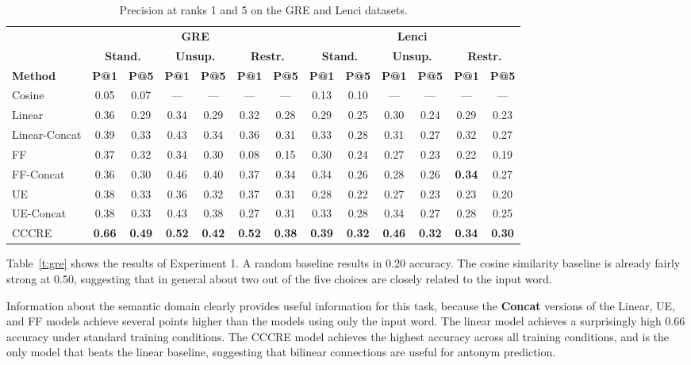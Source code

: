 \documentclass[11pt]{article}
\begin{document}
\begin{table}[t!]
\centering
\small
\setlength\tabcolsep{1.5pt}
\begin{tabular}{lcc|cc|cc||cc|cc|cc}
& \multicolumn{6}{c||}{\bf GRE} & \multicolumn{6}{c}{\bf Lenci} \\
& \multicolumn{2}{c|}{\bf Stand.} & \multicolumn{2}{c|}{\bf Unsup.} & \multicolumn{2}{c||}{\bf Restr.} & \multicolumn{2}{c|}{\bf Stand.} & \multicolumn{2}{c|}{\bf Unsup.} & \multicolumn{2}{c}{\bf Restr.} \\
\bf Method & \bf P@1 & \bf P@5  & \bf P@1 & \bf P@5  & \bf P@1 & \bf P@5  & \bf P@1 & \bf P@5  & \bf P@1 & \bf P@5  & \bf P@1 & \bf P@5  \\
\hline
\hline
Cosine & 0.05 & 0.07 & --- & --- & --- & --- & 0.13 & 0.10 & --- & --- & --- & --- \\
Linear & 0.36 & 0.29 & 0.34 & 0.29 & 0.32 & 0.28 & 0.29 & 0.25 & 0.30 & 0.24 & 0.29 & 0.23 \\
Linear-Concat & 0.39 & 0.33 & 0.43 & 0.34 & 0.36 & 0.31 & 0.33 & 0.28 & 0.31 & 0.27 & 0.32 & 0.27 \\
\hline
FF & 0.37 & 0.32 & 0.34 & 0.30 & 0.08 & 0.15 & 0.30 & 0.24 & 0.27 & 0.23 & 0.22 & 0.19 \\
FF-Concat & 0.36 & 0.30 & 0.46 & 0.40 & 0.37 & 0.34 & 0.34 &  0.26 & 0.28 & 0.26 & \bf 0.34 & 0.27 \\
UE & 0.38 & 0.33 & 0.36 & 0.32 & 0.37 & 0.31 & 0.28  & 0.22 & 0.27 & 0.23 & 0.23 & 0.20 \\
UE-Concat & 0.38 & 0.33 & 0.43 & 0.38 & 0.27 & 0.31 & 0.33 & 0.28 & 0.34 & 0.27 & 0.28 & 0.25 \\
CCCRE  & \bf 0.66 & \bf 0.49 & \bf 0.52 & \bf 0.42 & \bf 0.52 & \bf 0.38 & \bf 0.39 & \bf 0.32 & \bf 0.46 & \bf 0.32 & \bf 0.34 & \bf 0.30 \\
\end{tabular} 
\caption{Precision at ranks 1 and 5 on the GRE and Lenci datasets.}
\label{t:prec}
\end{table}

Table~\ref{t:gre} shows the results of Experiment 1. A random baseline results in 0.20 accuracy. The cosine similarity baseline is already fairly strong at 0.50, suggesting that in general about two out of the five choices are closely related to the input word.

Information about the semantic domain clearly provides useful information for this task, because the {\bf Concat} versions of the Linear, UE, and FF models achieve several points higher than the models using only the input word. The linear model achieves a surprisingly high 0.66 accuracy under standard training conditions. The CCCRE model achieves the highest accuracy across all training conditions, and is the only model that beats the linear baseline, suggesting that bilinear connections are useful for antonym prediction.
\end{document}
